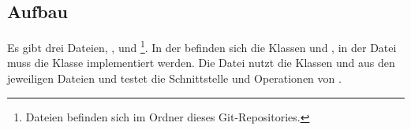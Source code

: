 \documentclass{article}
\begin{document}
		\subsection{Aufbau}
			Es gibt drei Dateien, \grqq{}, \grqq{} und \grqq{}\footnote{Dateien befinden sich im Ordner \grqq{} dieses Git-Repositories.}.
			In der \grqq{} befinden sich die Klassen \grqq{} und \grqq{},
			in der Datei \grqq{} muss die Klasse \grqq{} implementiert werden.
			Die Datei \grqq{} nutzt die Klassen \grqq{} und \grqq{} aus den jeweiligen Dateien und testet die Schnittstelle und Operationen von \grqq{}.\\
	
\end{document}
